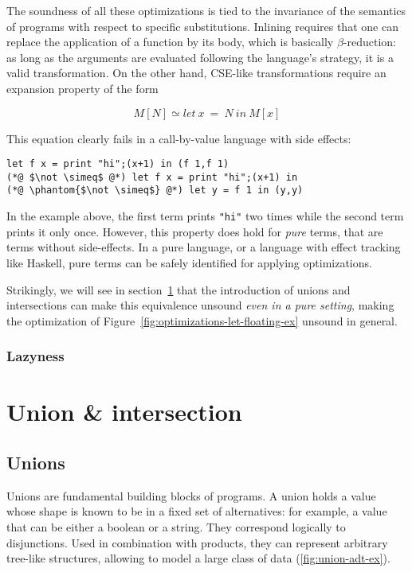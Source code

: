 \documentclass[sigplan,10pt,review,anonymous]{acmart}
\newcommand{\unsure}[2][1=]{}
\newcommand{\info}[2][1=]{}
\newcommand{\nickel}[1]{\lstinline[language=nickel]{#1}}
\begin{document}
The soundness of all these optimizations is tied to the invariance of the
semantics of programs with respect to specific substitutions. Inlining requires
that one can replace the application of a function by its body, which is
basically $\beta$-reduction: as long as the arguments are evaluated following
the language's strategy, it is a valid transformation. On the other hand,
CSE-like transformations require an expansion property of the form

$$M[N] \simeq let~x~=~N~in~M[x]$$

This equation clearly fails in a call-by-value language with side effects:

\begin{lstlisting}[language=Nickel]
let f x = print "hi";(x+1) in (f 1,f 1)
(*@ $\not \simeq$ @*) let f x = print "hi";(x+1) in
(*@ \phantom{$\not \simeq$} @*) let y = f 1 in (y,y)
\end{lstlisting}

In the example above, the first term prints \nickel{"hi"} two times while the
second term prints it only once. However, this property does hold for
\emph{pure} terms, that are terms without side-effects. In a pure language, or a
language with effect tracking like Haskell, pure terms can be safely identified for applying
optimizations.

Strikingly, we will see in section~\ref{} that the introduction of unions and
intersections can make this equivalence  unsound \emph{even in a
pure setting}, making the optimization of
Figure~\ref{fig:optimizations-let-floating-ex} unsound in general.

\unsure{Should we tease already here that unions and intersections break this
even for pure terms?}

\subsubsection*{Lazyness}
\unsure{Should we talk about lazyness?
this would be a good place to introduce it}

\newpage

\section{Union \& intersection}
\info{What are they, what are they used for.}

\subsection*{Unions}
Unions are fundamental building blocks of programs. A union holds a value whose
shape is known to be in a fixed set of alternatives: for example, a value that
can be either a boolean or a string. They correspond logically to disjunctions.
Used in combination with products, they can represent arbitrary tree-like
structures, allowing to model a large class of data
(\ref{fig:union-adt-ex}).
\end{document}
